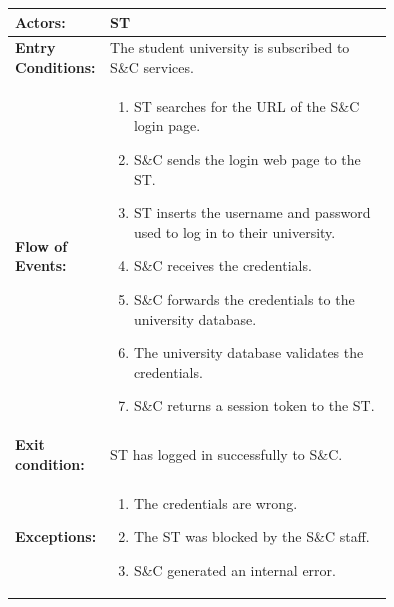 \begin{center}
    \begin{longtable}{|l|p{0.75\linewidth}|}
        \hline
        \textbf{Actors:}           & ST                                                                            \\
        \hline
        \textbf{Entry Conditions:} & The student university is subscribed to S\&C services.                        \\
        \hline
        \textbf{Flow of Events:}   & \begin{enumerate}
                                         \item ST searches for the URL of the S\&C login page.
                                         \item S\&C sends the login web page to the ST.
                                         \item ST inserts the username and password used to log in to their university.
                                         \item S\&C receives the credentials.
                                         \item S\&C forwards the credentials to the university database.
                                         \item The university database validates the credentials.
                                         \item S\&C returns a session token to the ST.
                                     \end{enumerate} \\
        \hline
        \textbf{Exit condition:}   & ST has logged in successfully to S\&C.                                        \\
        \hline
        \textbf{Exceptions:}       & \begin{enumerate}
                                         \item The credentials are wrong.
                                         \item The ST was blocked by the S\&C staff.
                                         \item S\&C generated an internal error.
                                     \end{enumerate}                                    \\
        \hline
    \end{longtable}
\end{center}

